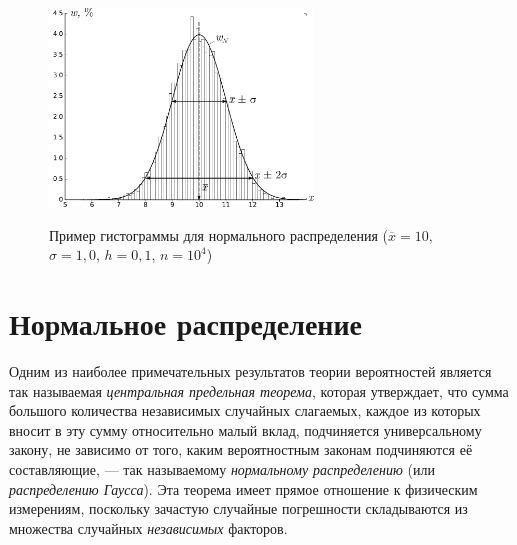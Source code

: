 \begin{figure}
    \centering
    \includegraphics[width=7cm]{images/normhist.pdf}
    \label{fig:normhist}
    \caption{Пример гистограммы для нормального распределения ($\overline{x}=10$, $\sigma=1{,}0$, $h=0{,}1$, $n=10^{4}$)}
\end{figure}




\section{Нормальное распределение}

Одним из наиболее примечательных результатов теории вероятностей является
так называемая \emph{центральная предельная теорема}, которая утверждает,
что сумма большого количества независимых случайных слагаемых, каждое
из которых вносит в эту сумму относительно малый вклад, подчиняется
универсальному закону, не зависимо от того, каким вероятностным законам
подчиняются её составляющие, --- так называемому \emph{нормальному
распределению} (или \emph{распределению Гаусса}). Эта теорема имеет
прямое отношение к физическим измерениям, поскольку зачастую случайные
погрешности складываются из множества случайных \emph{независимых}
факторов.

